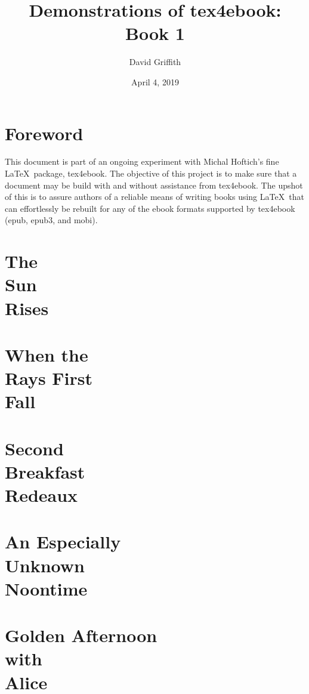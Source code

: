 \documentclass[12pt]{book}
\title{\Huge\textbf{Demonstrations of tex4ebook: Book 1}}
\author{David Griffith}
\date{April 4, 2019}
\begin{document}
\frontmatter
\maketitle
\tableofcontents

\mainmatter
\parskip=12pt

\chapter*{Foreword}
This document is part of an ongoing experiment with Michal Hoftich's 
fine \LaTeX\ package, tex4ebook.  The objective of this project is to 
make sure that a document may be build with and without assistance from 
tex4ebook.  The upshot of this is to assure authors of a reliable means 
of writing books using \LaTeX\ that can effortlessly be rebuilt for any 
of the ebook formats supported by tex4ebook (epub, epub3, and mobi).

\chapter[The Sun Rises]
{The\\
Sun\\
Rises}
\lipsum[1-20]

\chapter[When the Rays First Fall]
{When the\\
Rays First\\
Fall}
\lipsum[21-40]

\chapter[Second Breakfast Redeaux]
{Second\\
Breakfast\\
Redeaux}
\lipsum[41-60]

\chapter[An Especially Unknown Noontime]
{An Especially\\
Unknown\\
Noontime}
\lipsum[61-80]

\chapter[Golden Afternoon with Alice]
{Golden Afternoon\\
with\\
Alice}
\lipsum[81-100]
\end{document}
